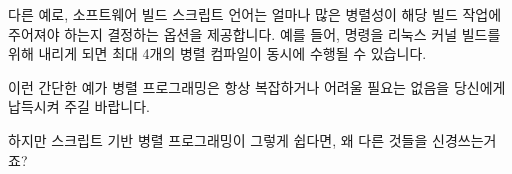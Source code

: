 다른 예로,  소프트웨어 빌드 스크립트 언어는 얼마나 많은 병렬성이 해당
빌드 작업에 주어져야 하는지 결정하는  옵션을 제공합니다.
예를 들어,  명령을 리눅스 커널 빌드를 위해 내리게 되면 최대 4개의
병렬 컴파일이 동시에 수행될 수 있습니다.

이런 간단한 예가 병렬 프로그래밍은 항상 복잡하거나 어려울 필요는 없음을
당신에게 납득시켜 주길 바랍니다.

\QuickQuiz{}
	하지만 스크립트 기반 병렬 프로그래밍이 그렇게 쉽다면, 왜 다른 것들을
	신경쓰는거죠?

